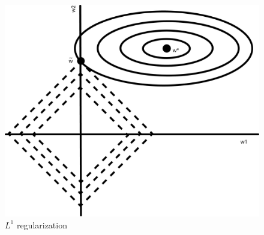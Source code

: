 \begin{exercise}
\begin{enumerate}
    \begin{figure}[h!]
        \centering
        \includegraphics[scale=0.5]{img/L1_norm.png}
        \caption{$L^1$ regularization}
        \label{fig:my_label}
    \end{figure}
\end{enumerate}
\end{exercise}

